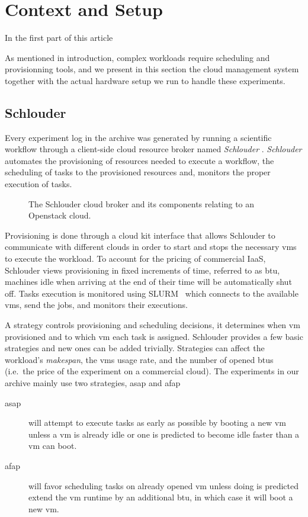 \section{Context and Setup}
\label{sc:context}

In the first part of this article

As  mentioned   in  introduction,  complex  workloads   require  scheduling  and
provisionning tools, and we present in  this section the cloud management system
together with the actual hardware setup we run to handle these experiments.

\subsection{Schlouder}

Every  experiment log  in  the archive  was generated  by  running a  scientific
workflow  through a  client-side  cloud resource  broker named  \emph{Schlouder}
\cite{Michon17}. \emph{Schlouder} automates the provisioning of resources needed
to execute a workflow, the scheduling of tasks to the provisioned resources and,
monitors the proper execution of tasks.
%
\begin{figure}
	\centering
	
	\caption{The Schlouder cloud broker and its components relating to an
	Openstack cloud.}
\end{figure}
%
Provisioning is  done through  a cloud  kit interface  that allows  Schlouder to
communicate with  different clouds  in order  to start  and stops  the necessary
\acp{vm} to  execute the  workload.  To  account for  the pricing  of commercial
IaaS, Schlouder views  provisioning in fixed increments of time,  referred to as
\ac{btu},  machines  idle  when arriving  at  the  end  of  their time  will  be
automatically shut off.
%
Tasks execution  is monitored using  SLURM~\cite{YooJG03} which connects  to the
available \acp{vm}, send the jobs, and monitors their executions.

A strategy controls provisioning and scheduling decisions, it determines when
\ac{vm} provisioned and to which \ac{vm} each task is assigned. Schlouder
provides a few basic strategies and new ones can be added trivially. Strategies
can affect the workload's \emph{makespan}, the \acp{vm} usage rate, and the
number of opened \acp{btu} (i.e.\ the price of the experiment on a commercial
cloud). The experiments in our archive mainly use two strategies, \ac{asap} and
\ac{afap}

\begin{description}
	\item[\ac{asap}] will attempt to execute tasks as early as possible by
		booting a new \ac{vm} unless a \ac{vm} is already idle or one is
		predicted to become idle faster than a \ac{vm} can boot.
	\item[\ac{afap}] will favor scheduling tasks on already opened \ac{vm}
		unless doing is predicted extend the \ac{vm} runtime by an
		additional \ac{btu}, in which case it will boot a new \ac{vm}.
\end{description}

